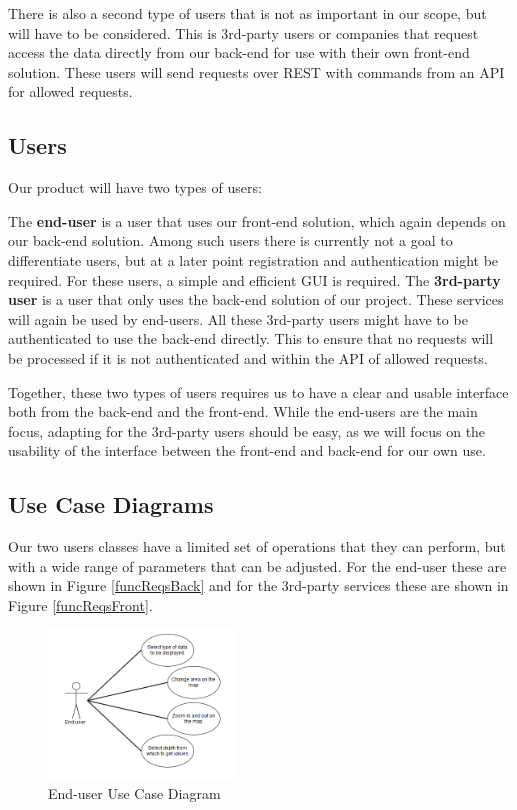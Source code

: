 \documentclass[11pt,a4paper,titlepage,oneside]{report}
\begin{document}
  There is also a second type of users that is not as important in our scope, but will have to be considered. This is 3rd-party users or companies that request access the data directly from our \gls{back-end} for use with their own \gls{front-end} solution. These users will send requests over REST with commands from an \gls{API} for allowed requests.

  \subsection{Users}
  Our product will have two types of users:
  
  The \textbf{end-user} is a user that uses our \gls{front-end} solution, which again depends on our \gls{back-end} solution. Among such users there is currently not a goal to differentiate users, but at a later point registration and authentication might be required. For these users, a simple and efficient \gls{GUI} is required.  
  The \textbf{3rd-party user} is a user that only uses the \gls{back-end} solution of our project. These services will again be used by end-users. All these 3rd-party users might have to be authenticated to use the \gls{back-end} directly. This to ensure that no requests will be processed if it is not authenticated and within the \gls{API} of allowed requests.
  
  Together, these two types of users requires us to have a clear and usable interface both from the \gls{back-end} and the \gls{front-end}. While the end-users are the main focus, adapting for the 3rd-party users should be easy, as we will focus on the usability of the interface between the \gls{front-end} and \gls{back-end} for our own use.

  \subsection{Use Case Diagrams}
  Our two users classes have a limited set of operations that they can perform, but with a wide range of parameters that can be adjusted. For the end-user these are shown in Figure \ref{funcReqsBack} and for the 3rd-party services these are shown in Figure \ref{funcReqsFront}.
  \begin{figure}[h]
	\begin{center}
	\includegraphics[height=150px]{img/useCase_EndUser.png}
	\caption{End-user Use Case Diagram}
	\label{fig:endUserUseDiagram}
	\small
	\end{center}
  \end{figure}
\end{document}
